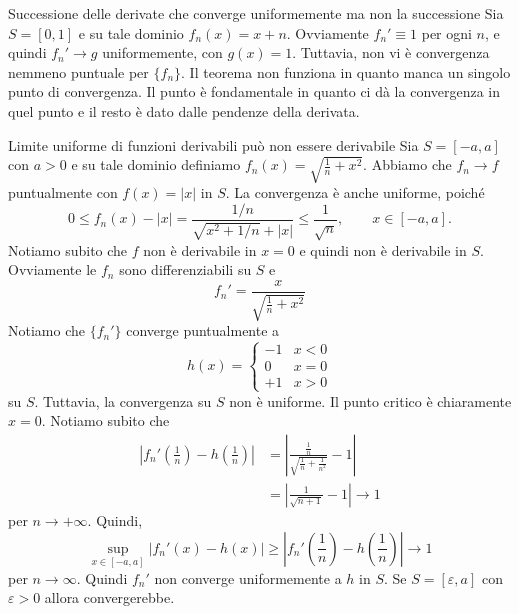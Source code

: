 \documentclass[a4paper]{article}
\begin{document}
\begin{radioactive}
\begin{snippetexample}{Successione delle derivate che converge uniformemente ma non la successione}
    Sia \(S = [0,1]\) e su tale dominio \(f_n(x) = x + n\).
    Ovviamente \(f_n' \equiv 1\) per ogni \(n\), e quindi \(f_n' \to g\) uniformemente, con \(g(x)=1\).
    Tuttavia, non vi è convergenza nemmeno puntuale per \(\{f_n\}\).
    Il teorema non funziona in quanto manca un singolo punto di convergenza.
    Il punto è fondamentale in quanto ci dà la convergenza in quel punto e il resto è dato
    dalle pendenze della derivata.
\end{snippetexample}
\end{radioactive}

\begin{radioactive}
\begin{snippetexample}{Limite uniforme di funzioni derivabili può non essere derivabile}
    Sia \(S = [-a, a]\) con \(a > 0\) e su tale dominio definiamo \(f_n(x) = \sqrt{\frac1n + x^2}\).
    Abbiamo che \(f_n \to f\) puntualmente con \(f(x) = |x|\) in \(S\).
    La convergenza è anche uniforme, poiché
    \[
        0 \leq f_n(x)-|x| = \frac{1/n}{\sqrt{x^2+1/n}+|x|} \leq \frac{1}{\sqrt n},
        \qquad x\in[-a,a].
    \]
    Notiamo subito che \(f\) non è derivabile in \(x=0\) e quindi non è derivabile in \(S\).
    Ovviamente le \(f_n\) sono differenziabili su \(S\) e \[
        f_n' = \frac{x}{\sqrt{\frac1n + x^2}}
    \]
    Notiamo che \(\{f_n'\}\) converge puntualmente a \[
        h(x) =
        \begin{cases}
            -1 & x < 0 \\
            0 & x = 0 \\
            +1 & x > 0
        \end{cases}
    \]
    su \(S\).
    Tuttavia, la convergenza su \(S\) non è uniforme.
    Il punto critico è chiaramente \(x=0\).
    Notiamo subito che
    \begin{align*}
        \left|f_n'\left(\frac1n\right) - h\left(\frac1n\right)\right|
        &= \left|
        \frac{\frac1n}{\sqrt{\frac1n + \frac{1}{n^2}}} - 1
        \right| \\
        &= \left|
        \frac{1}{\sqrt{n+1}} - 1
        \right| \to 1
    \end{align*}
    per \(n \to +\infty\).
    Quindi,
    \[
        \sup_{x\in[-a,a]}|f_n'(x)-h(x)|
        \geq \left|f_n'\left(\frac1n\right)-h\left(\frac1n\right)\right|\to1
    \]
    per \(n \to \infty\).
    Quindi \(f_n'\) non converge uniformemente a \(h\) in \(S\).
    Se \(S = [\varepsilon, a]\) con \(\varepsilon > 0\) allora convergerebbe.
\end{snippetexample}
\end{radioactive}
\end{document}
